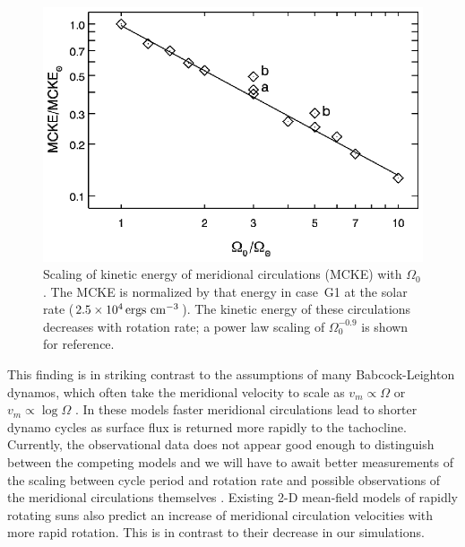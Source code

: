 \begin{figure}[!tp]
  \begin{center}
    \includegraphics[width=0.7\linewidth]{figs/chapter_3/Figure_12.eps}
  \end{center}
  \caption[Scaling of kinetic energy of meridional circulations (MCKE) with $\Omega_0$]
  {Scaling of kinetic energy of meridional circulations (MCKE) with
  $\Omega_0$.  The MCKE is
  normalized by that energy in case~G1 at the solar rate
  ($2.5\times 10^4 \thinspace \mathrm{ergs}~\mathrm{cm}^{-3}$).
  The kinetic energy of these 
  circulations decreases with rotation rate; a power law
  scaling of $\Omega_0^{-0.9}$ is shown for reference.  
   \label{fig:MCKE_vs_omega}}
\end{figure}

This finding is in striking contrast to the assumptions of many
Babcock-Leighton dynamos, which often take the meridional velocity to
scale as $v_m \propto \Omega$ or $v_m \propto \log{\Omega}$ 
\citep[e.g.,][]{Charbonneau&Saar_2001, Dikpati_et_al_2001}.  
In these models faster meridional circulations lead to shorter dynamo
cycles as surface flux is returned more rapidly to the tachocline.
Currently, the observational data does not appear good enough to
distinguish between the competing models and we will have to await
better measurements of the scaling between cycle period and rotation
rate and possible observations of the meridional circulations
themselves \citep{Rempel_2008}.
Existing 2-D mean-field models of rapidly rotating suns
\citep{Kuker&Stix_2001, Rudiger_et_al_1998, Kuker&Rudiger_2005_A&A}
also predict an increase of meridional circulation velocities with more
rapid rotation.  This is in contrast to their decrease in our simulations.




